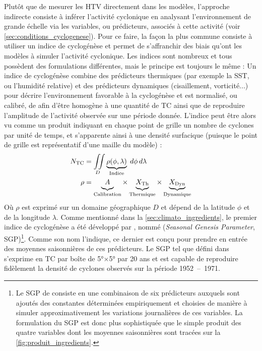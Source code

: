 \documentclass[../main.tex]{subfiles}
\begin{document}
Plutôt que de mesurer les HTV directement dans les modèles, l'approche indirecte consiste à inférer l'activité cyclonique en analysant l'environnement de grande
échelle via les variables, ou prédicteurs, associés à cette activité (voir \cref{sec:conditions_cyclogenese}). Pour ce faire, la façon la plus commune consiste
à utiliser un indice de cyclogénèse \parencite{gray_tropical_1975} et permet de s'affranchir des biais qu'ont les modèles à simuler l'activité cyclonique. Les
indices sont nombreux et tous possèdent des formulations différentes, mais le principe est toujours le même : Un indice de cyclogénèse combine des prédicteurs
thermiques (par exemple la SST, ou l'humidité relative) et des prédicteurs dynamiques (cisaillement, vorticité...) pour décrire l'environnement favorable à la
cyclogénèse et est normalisé, ou calibré, de afin d'être homogène à une quantité de TC ainsi que de reproduire l'amplitude de l'activité observée sur une période
donnée. L'indice peut être alors vu comme un produit indiquant en chaque point de grille un nombre de cyclones par unité de temps, et s'apparente ainsi à une densité
surfacique (puisque le point de grille est représentatif d'une maille du modèle) :
%
\begin{align*}
    N_{\text{TC}} &= \iint\limits_{D} \underbrace{\rho(\phi, \lambda)}_{\text{Indice}} \; d\phi \, d\lambda \\
    \rho &= \underbrace{\vphantom{X_{\text{Dyn}}}A}_{\text{Calibration}} \times \underbrace{\vphantom{X_{\text{Dyn}}}X_{\text{Th}}}_{\text{Thermique}} \times
    \underbrace{X_{\text{Dyn}}}_{\text{Dynamique}}
\end{align*}
%
Où $\rho$ est exprimé sur un domaine géographique $D$ et dépend de la latitude $\phi$ et de la longitude $\lambda$. Comme mentionné dans la
\cref{sec:climato_ingredients}, le premier indice de cyclogénèse a été développé par \cite{gray_tropical_1975}, nommé  (\textit{Seasonal Genesis Parameter}, SGP)\footnote{Le SGP de \cite{gray_tropical_1975} consiste en une combinaison de six prédicteurs auxquels
sont ajoutés des constantes déterminées empiriquement et choisies de manière à simuler approximativement les variations journalières de ces variables. La
formulation du SGP est donc plus sophistiquée que le simple produit des quatre variables dont les moyennes saisonnières sont tracées sur la
\cref{fig:produit_ingredients}.}. Comme son nom l'indique, ce dernier est conçu pour prendre en entrée des moyennes saisonnières de ces
prédicteurs. Le SGP tel que défini dans \cite{gray_tropical_1975} s'exprime en TC par boîte de \ang{5}$\times$\ang{5} par 20 ans et est capable de reproduire
fidèlement la densité de cyclones observés sur la période \num{1952}~--~\num{1971}.
\end{document}
